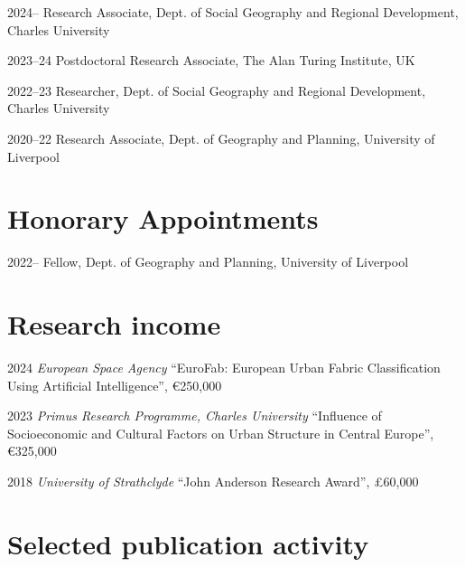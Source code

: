\documentclass[11pt,a4paper]{report}
\begin{document}
    \begin{tablist}

        \item[2024--] \tab{}Research Associate, Dept. of Social Geography and Regional Development, Charles University

        \item[2023--24] \tab{}Postdoctoral Research Associate, The Alan Turing Institute, UK

        \item[2022--23] \tab{}Researcher, Dept. of Social Geography and Regional Development, Charles University

        \item[2020--22] \tab{}Research Associate, Dept. of Geography and Planning, University of Liverpool

    \end{tablist}


    \section*{Honorary Appointments}

    \begin{tablist}

        \item[2022--] \tab{}Fellow, Dept. of Geography and Planning, University of Liverpool
    \end{tablist}

    \section*{Research income}

    \begin{tablist}

        \item[2024] \tab{}\textit{European Space Agency} \enquote{EuroFab: European Urban Fabric Classification Using Artificial Intelligence}, €250,000
        \item[2023] \tab{}\textit{Primus Research Programme, Charles University} \enquote{Influence of Socioeconomic and Cultural Factors on Urban Structure in Central Europe}, €325,000
        \item[2018] \tab{}\textit{University of Strathclyde} \enquote{John Anderson Research Award}, £60,000

    \end{tablist}


    \section*{Selected publication activity}
\end{document}
